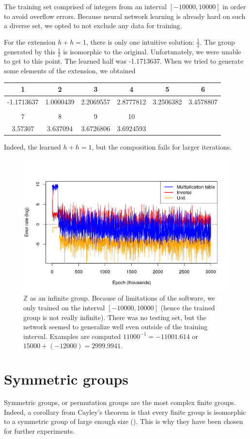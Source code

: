  The training set comprised of integers from an interval $[-10000,10000]$ in order to avoid overflow errors. Because neural network learning is already hard on such a diverse set, we opted to not exclude any data for training.

For the extension $h+h=1$, there is only one intuitive solution: $\frac{1}{2}$. The group generated by this $\frac{1}{2}$ is isomorphic to the original. Unfortunately, we were unable to get to this point. The learned half was 
-1.1713637. When we tried to generate some elements of the extension, we obtained

\begin{tabular}{cccccc}
1&2&3&4&5&6\\
\hline
-1.1713637&1.0000439&2.2069557&2.8777812&3.2506382&3.4578807\\
 \\
7&8&9&10\\
\hline 
3.57307&3.637094&3.6726806&3.6924593
\end{tabular}

Indeed, the learned $h+h=1$, but the composition fails for larger iterations.
\begin{figure}
\caption{$\mathbb{Z}$ as an infinite group. Because of limitations of the software, we only trained on the interval $[-10000,10000]$ (hence the trained group is not really infinite). There was no testing set, but the network seemed to generalize well even outside of the training interval. Examples are computed $11000^{-1}=-11001.614$ or $15000+(-12000)=2999.9941$.}
\centering
\label{graph:z_inf}
\includegraphics[width=\linewidth]{../img/z_inf.png}
\end{figure}

\section{Symmetric groups}
Symmetric groups, or permutation groups are the most complex finite groups. Indeed, a corollary from Cayley's theorem  is that every finite group is isomorphic to a symmetric group of large enough size (\cite{cayley}). This is why they have been chosen for further experiments.


